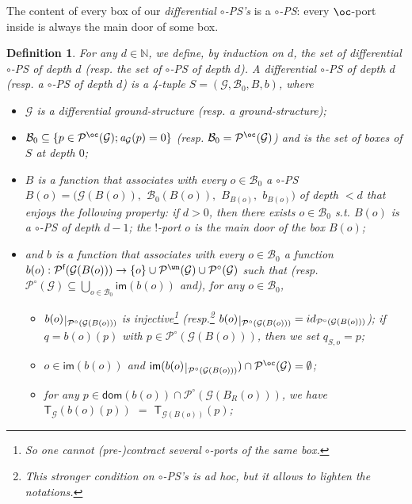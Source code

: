 \documentclass{article}
\theoremstyle{plain}
\newtheorem{definition}{Definition}
\newcommand{\Nat}{\ensuremath{\mathbb{N}}}
\newcommand{\groundof}[1]{\mathcal{G}(#1)}
\def\restriction#1#2{\mathchoice
              {\setbox1\hbox{${\displaystyle #1}_{\scriptstyle #2}$}
              \restrictionaux{#1}{#2}}
              {\setbox1\hbox{${\textstyle #1}_{\scriptstyle #2}$}
              \restrictionaux{#1}{#2}}
              {\setbox1\hbox{${\scriptstyle #1}_{\scriptscriptstyle #2}$}
              \restrictionaux{#1}{#2}}
              {\setbox1\hbox{${\scriptscriptstyle #1}_{\scriptscriptstyle #2}$}
              \restrictionaux{#1}{#2}}}
\def\restrictionaux#1#2{{#1\,\smash{\vrule height .8\ht1 depth .85\dp1}}_{\,#2}}
\newcommand{\dom}[1]{\textsf{dom}(#1)}
\newcommand{\im}[1]{\textsf{im}(#1)}
\newcommand{\cod}{\oc}
\newcommand{\contr}{\wn}
\newcommand{\arity}[1]{{\textit{a}}_{#1}}
\newcommand{\conclusions}[1]{\mathcal{P}^{\textsf{f}}(#1)}
\newcommand{\portsoftype}[2]{\mathcal{P}^{#1}(#2)}
\newcommand{\boxesatzero}[1]{\mathcal{B}_{0}(#1)}
\begin{document}
The content of every box of our \emph{differential $\circ$-PS's} is a \emph{$\circ$-PS}: every $\cod$-port inside is always the main door of some box.

\begin{definition}\label{defin: differential PS}
For any $d \in \Nat$, we define, by induction on $d$, the set of \emph{differential $\circ$-PS of depth $d$} (resp. the set of \emph{$\circ$-PS of depth $d$}). 
A \emph{differential $\circ$-PS of depth $d$} (resp. a \emph{$\circ$-PS of depth $d$}) is a 4-tuple $S = (\mathcal{G}, \mathcal{B}_0, B, b)$, where
\begin{itemize}
\item $\mathcal{G}$ is a differential ground-structure (resp. a ground-structure);
\item $\mathcal{B}_0 \subseteq \{ p \in \portsoftype{\cod}{\mathcal{G}} ; \arity{\mathcal{G}}(p) = 0 \}$ (resp. $\mathcal{B}_0 = \portsoftype{\cod}{\mathcal{G}}$) and is the set of \emph{boxes of $S$ at depth $0$}; 
\item $B$ is a function that associates with every $o \in \mathcal{B}_0$ a $\circ$-PS $B(o) = (\groundof{B(o)}, $ $\boxesatzero{B(o)}, $ $B_{B(o)}, $ $b_{B(o)})$ of depth $< d$ that enjoys the following property: if $d > 0$, then there exists $o \in \mathcal{B}_0$ s.t. $B(o)$ is a $\circ$-PS of depth $d-1$; the $!$-port $o$ is \emph{the main door of the box $B(o)$};
\item and $b$ is a function that associates with every $o \in \mathcal{B}_0$ a function $b(o) : \conclusions{\groundof{B(o)}} \to \{ o \} \cup \portsoftype{\contr}{\mathcal{G}} \cup \portsoftype{\circ}{\mathcal{G}}$ such that (resp. $\portsoftype{\circ}{\mathcal{G}} \subseteq \bigcup_{o \in \mathcal{B}_0} \im{b(o)}$ and), for any $o \in \mathcal{B}_0$, 
\begin{itemize}
\item $\restriction{b(o)}{\portsoftype{\circ}{\groundof{B(o)}}}$ is injective\footnote{So one cannot (pre-)contract several $\circ$-ports of the same box.} (resp.\footnote{This stronger condition on $\circ$-PS's is \emph{ad hoc}, but it allows to lighten the notations.} $\restriction{b(o)}{\portsoftype{\circ}{\groundof{B(o)}}} = id_{\portsoftype{\circ}{\groundof{B(o)}}}$); if $q = b(o)(p)$ with $p \in {\portsoftype{\circ}{\groundof{B(o)}}}$, then we set $q_{S, o} = p$;
\item $o \in \im{b(o)}$ and $\im{\restriction{b(o)}{\portsoftype{\circ}{\groundof{B(o)}}}} \cap \portsoftype{\cod}{\mathcal{G}} = \emptyset$;
\item for any $p \in \dom{b(o)} \cap \portsoftype{\circ}{\groundof{B_R(o)}}$, we have $\textsf{T}_{\mathcal{G}}(b(o)(p))$ $=$ $\textsf{T}_{\groundof{B(o)}}(p)$;

\end{itemize}
\end{itemize}
\end{definition}
\end{document}
